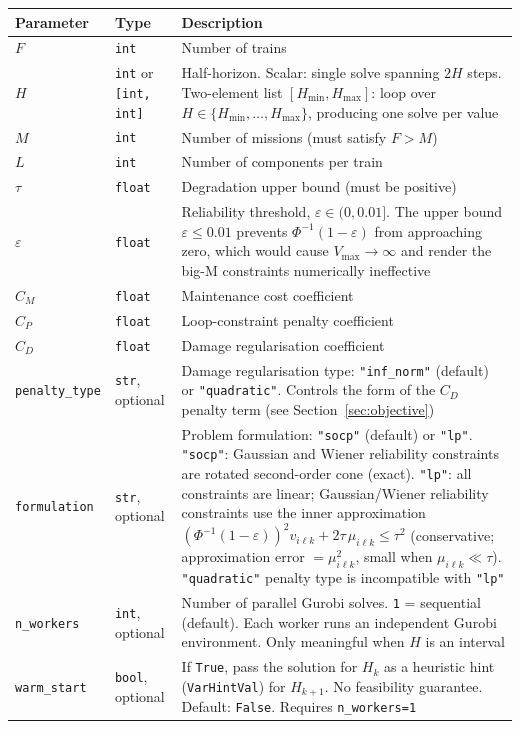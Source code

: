 \documentclass[11pt,a4paper]{article}
\begin{document}
\begin{longtable}{@{}llp{8cm}@{}}
\toprule
Parameter & Type & Description \\
\midrule
$F$ & \texttt{int} & Number of trains \\
$H$ & \texttt{int} or \texttt{[int, int]} & Half-horizon. Scalar: single solve spanning $2H$
  steps. Two-element list $[H_{\min}, H_{\max}]$: loop over
  $H \in \{H_{\min},\ldots,H_{\max}\}$, producing one solve per value \\
$M$ & \texttt{int} & Number of missions (must satisfy $F > M$) \\
$L$ & \texttt{int} & Number of components per train \\
$\tau$ & \texttt{float} & Degradation upper bound (must be positive) \\
$\varepsilon$ & \texttt{float} & Reliability threshold, $\varepsilon \in (0, 0.01]$.
  The upper bound $\varepsilon \leq 0.01$ prevents $\Phi^{-1}(1-\varepsilon)$ from
  approaching zero, which would cause $V_{\max} \to \infty$ and render the
  big-M constraints numerically ineffective \\
$C_M$ & \texttt{float} & Maintenance cost coefficient \\
$C_P$ & \texttt{float} & Loop-constraint penalty coefficient \\
$C_D$ & \texttt{float} & Damage regularisation coefficient \\
\texttt{penalty\_type} & \texttt{str}, optional & Damage regularisation type:
  \texttt{"inf\_norm"} (default) or \texttt{"quadratic"}.
  Controls the form of the $C_D$ penalty term (see Section~\ref{sec:objective}) \\
\texttt{formulation} & \texttt{str}, optional & Problem formulation:
  \texttt{"socp"} (default) or \texttt{"lp"}.
  \texttt{"socp"}: Gaussian and Wiener reliability constraints are rotated
  second-order cone (exact).
  \texttt{"lp"}: all constraints are linear; Gaussian/Wiener reliability
  constraints use the inner approximation
  $(\Phi^{-1}(1-\varepsilon))^2 v_{i\ell k} + 2\tau\,\mu_{i\ell k} \leq \tau^2$
  (conservative; approximation error $= \mu_{i\ell k}^2$, small when $\mu_{i\ell k} \ll \tau$).
  \texttt{"quadratic"} penalty type is incompatible with \texttt{"lp"} \\
\texttt{n\_workers} & \texttt{int}, optional & Number of parallel Gurobi solves.
  \texttt{1} = sequential (default). Each worker runs an independent Gurobi environment.
  Only meaningful when $H$ is an interval \\
\texttt{warm\_start} & \texttt{bool}, optional & If \texttt{True}, pass the solution for
  $H_k$ as a heuristic hint (\texttt{VarHintVal}) for $H_{k+1}$. No feasibility guarantee.
  Default: \texttt{False}. Requires \texttt{n\_workers=1} \\
\bottomrule
\end{longtable}
\end{document}
